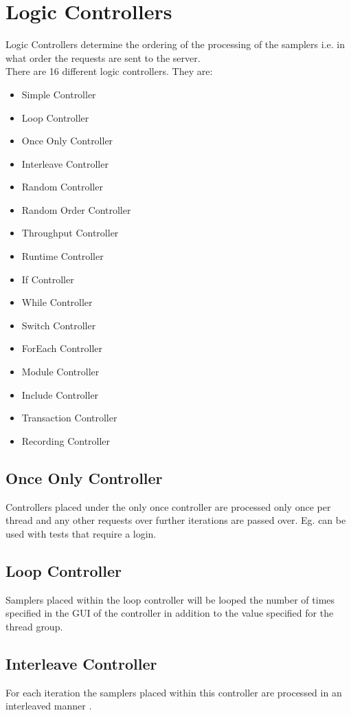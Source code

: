 \documentclass[12pt]{book}
\begin{document}
\section{Logic Controllers}
  Logic Controllers determine the ordering of the processing of the samplers  i.e. in what order the requests are sent to the server. \\
  There are 16 different logic controllers. They are:\cite{Ehh} \cite{Jmeter}\cite{Manual}
  \begin{itemize}
   \item Simple Controller 
   \item Loop Controller 
   \item Once Only Controller 
   \item Interleave Controller 
   \item Random Controller 
   \item Random Order Controller 
   \item Throughput Controller 
   \item Runtime Controller 
   \item If Controller 
   \item While Controller 
   \item Switch Controller 
   \item ForEach Controller 
   \item Module Controller 
   \item Include Controller 
   \item Transaction Controller 
   \item Recording Controller
  \end{itemize}

  \subsection{Once Only Controller}
  Controllers placed under the only once controller are processed only once per thread and any other 
  requests over further iterations are passed over. Eg. can be used with tests that require a login.
  
  \subsection{Loop Controller}
  Samplers placed within the loop controller will be looped the number of times specified in the GUI of 
  the controller in addition to the value specified for the thread group.
  
  \subsection{Interleave Controller}
  For each iteration the samplers placed within this controller are processed in an interleaved manner .
\end{document}
